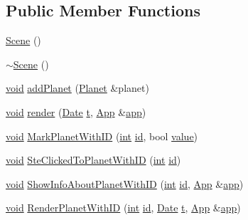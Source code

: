 \subsection*{Public Member Functions}
\begin{DoxyCompactItemize}
\item 
\hyperlink{class_scene_ad10176d75a9cc0da56626f682d083507}{Scene} ()
\item 
\hyperlink{class_scene_a3b8cec2e32546713915f8c6303c951f1}{$\sim$\+Scene} ()
\item 
\hyperlink{wglext_8h_a9e6b7f1933461ef318bb000d6bd13b83}{void} \hyperlink{class_scene_a0f38de768620105c6026743a2bd8a851}{add\+Planet} (\hyperlink{class_planet}{Planet} \&planet)
\item 
\hyperlink{wglext_8h_a9e6b7f1933461ef318bb000d6bd13b83}{void} \hyperlink{class_scene_a2708a12dc045758611cabc6aad195a4a}{render} (\hyperlink{class_date}{Date} \hyperlink{glext_8h_a7d65d00ca3b0630d9b5c52df855b19f5}{t}, \hyperlink{class_app}{App} \&\hyperlink{_routine_8cpp_a05b5a24325d46227633053ca49de6234}{app})
\item 
\hyperlink{wglext_8h_a9e6b7f1933461ef318bb000d6bd13b83}{void} \hyperlink{class_scene_a67017a8885dec76253de41a72bb4e261}{Mark\+Planet\+With\+I\+D} (\hyperlink{wglext_8h_a500a82aecba06f4550f6849b8099ca21}{int} \hyperlink{glext_8h_a58c2a664503e14ffb8f21012aabff3e9}{id}, bool \hyperlink{glext_8h_a79169be77d7e02a24f68a5bfe627dc29}{value})
\item 
\hyperlink{wglext_8h_a9e6b7f1933461ef318bb000d6bd13b83}{void} \hyperlink{class_scene_af5e1d394058db0bf6640222690ea1afe}{Ste\+Clicked\+To\+Planet\+With\+I\+D} (\hyperlink{wglext_8h_a500a82aecba06f4550f6849b8099ca21}{int} \hyperlink{glext_8h_a58c2a664503e14ffb8f21012aabff3e9}{id})
\item 
\hyperlink{wglext_8h_a9e6b7f1933461ef318bb000d6bd13b83}{void} \hyperlink{class_scene_a1e1e900238cc3e383cb2796530c443dc}{Show\+Info\+About\+Planet\+With\+I\+D} (\hyperlink{wglext_8h_a500a82aecba06f4550f6849b8099ca21}{int} \hyperlink{glext_8h_a58c2a664503e14ffb8f21012aabff3e9}{id}, \hyperlink{class_app}{App} \&\hyperlink{_routine_8cpp_a05b5a24325d46227633053ca49de6234}{app})
\item 
\hyperlink{wglext_8h_a9e6b7f1933461ef318bb000d6bd13b83}{void} \hyperlink{class_scene_ad468e34bb62f2acc253820d883f1c141}{Render\+Planet\+With\+I\+D} (\hyperlink{wglext_8h_a500a82aecba06f4550f6849b8099ca21}{int} \hyperlink{glext_8h_a58c2a664503e14ffb8f21012aabff3e9}{id}, \hyperlink{class_date}{Date} \hyperlink{glext_8h_a7d65d00ca3b0630d9b5c52df855b19f5}{t}, \hyperlink{class_app}{App} \&\hyperlink{_routine_8cpp_a05b5a24325d46227633053ca49de6234}{app})

\end{DoxyCompactItemize}
